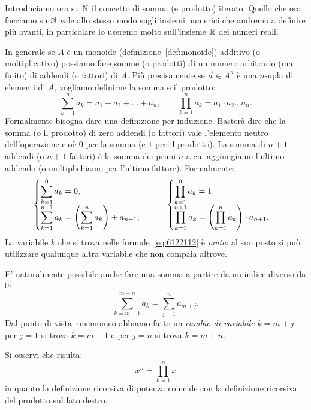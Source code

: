 Introduciamo ora su ${\mathbb N}$ il concetto di somma (e prodotto) iterato.
Quello che ora facciamo su ${\mathbb N}$ vale allo stesso modo sugli insiemi 
numerici che andremo a definire più avanti, in particolare lo useremo 
molto sull'insieme ${\mathbb R}$ dei numeri reali. 

In generale se $A$ è un monoide (definizione~\ref{def:monoide}) additivo 
(o moltiplicativo) possiamo fare somme (o prodotti) di un numero 
arbitrario (ma finito) di addendi (o fattori) di $A$.
Più precisamente se $\vec a \in A^n$ 
è una $n$-upla di elementi di $A$, 
vogliamo definirne la somma e il prodotto:
\begin{equation}\label{eq:6122112}
\sum_{k=1}^n a_k = a_1 + a_2 + \dots + a_n,
\qquad 
\prod_{k=1}^n a_k = a_1 \cdot a_2 \dots a_n.
\end{equation}
Formalmente bisogna dare una definizione per induzione. 
Basterà dire che la somma (o il prodotto)
di zero addendi (o fattori) vale l'elemento neutro 
dell'operazione cioè $0$ per la somma (e $1$ per il prodotto).
La somma di $n+1$ addendi (o $n+1$ fattori) è la somma dei primi $n$ 
a cui aggiungiamo l'ultimo addendo (o moltiplichiamo per l'ultimo fattore).
Formalmente:
\[
  \begin{cases}
    \displaystyle\sum_{k=1}^{0} a_k = 0, \\
    \displaystyle\sum_{k=1}^{n+1} a_k = {\left( \sum_{k=1}^{n} a_k \right)} + a_{n+1};
  \end{cases}  \qquad
  \begin{cases}
    \displaystyle\prod_{k=1}^{0} a_k = 1, \\
    \displaystyle\prod_{k=1}^{n+1} a_k = {\left( \prod_{k=1}^{n} a_k \right)} \cdot a_{n+1}.
  \end{cases}
\]
La variabile $k$ che si trova nelle formule~\eqref{eq:6122112} è \emph{muta}: 
al suo posto si può utilizzare qualunque altra variabile che non
compaia altrove.

E' naturalmente possibile anche fare una somma a partire da un indice 
diverso da $0$:
\[
  \sum_{k=m+1}^{m+n} a_k = \sum_{j=1}^{n} a_{m+j}.
\]
Dal punto di vista mnemonico abbiamo fatto 
un \emph{cambio di variabile} $k=m+j$:
per $j=1$ si trova $k=m+1$ e per $j=n$ si trova $k=m+n$.

Si osservi che risulta:
\[
  x^n = \prod_{k=1}^n x
\]
in quanto la definizione ricorsiva di potenza coincide 
con la definizione ricorsiva del prodotto sul lato destro.

